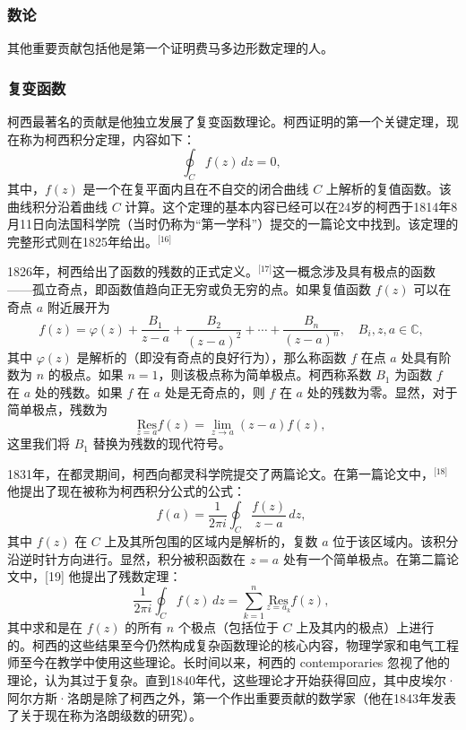 \subsubsection{数论}  
其他重要贡献包括他是第一个证明费马多边形数定理的人。
\subsubsection{复变函数}  
柯西最著名的贡献是他独立发展了复变函数理论。柯西证明的第一个关键定理，现在称为柯西积分定理，内容如下：
\[
\oint_{C} f(z) \, dz = 0,~
\]
其中，\( f(z) \) 是一个在复平面内且在不自交的闭合曲线 \( C \) 上解析的复值函数。该曲线积分沿着曲线 \( C \) 计算。这个定理的基本内容已经可以在24岁的柯西于1814年8月11日向法国科学院（当时仍称为“第一学科”）提交的一篇论文中找到。该定理的完整形式则在1825年给出。\(^\text{[16]}\)

1826年，柯西给出了函数的残数的正式定义。\(^\text{[17]}\)这一概念涉及具有极点的函数——孤立奇点，即函数值趋向正无穷或负无穷的点。如果复值函数 \( f(z) \) 可以在奇点 \( a \) 附近展开为
\[
f(z) = \varphi(z) + \frac{B_1}{z-a} + \frac{B_2}{(z-a)^2} + \cdots + \frac{B_n}{(z-a)^n}, \quad B_i, z, a \in \mathbb{C},~
\]
其中 \( \varphi(z) \) 是解析的（即没有奇点的良好行为），那么称函数 \( f \) 在点 \( a \) 处具有阶数为 \( n \) 的极点。如果 \( n = 1 \)，则该极点称为简单极点。柯西称系数 \( B_1 \) 为函数 \( f \) 在 \( a \) 处的残数。如果 \( f \) 在 \( a \) 处是无奇点的，则 \( f \) 在 \( a \) 处的残数为零。显然，对于简单极点，残数为
\[
\underset{z=a}{\mathrm{Res}} f(z) = \lim_{z \to a} (z-a) f(z),~
\]
这里我们将 \( B_1 \) 替换为残数的现代符号。

1831年，在都灵期间，柯西向都灵科学院提交了两篇论文。在第一篇论文中，\(^\text{[18]}\)他提出了现在被称为柯西积分公式的公式：
\[
f(a) = \frac{1}{2\pi i} \oint_C \frac{f(z)}{z-a} \, dz,~
\]
其中 \( f(z) \) 在 \( C \) 上及其所包围的区域内是解析的，复数 \( a \) 位于该区域内。该积分沿逆时针方向进行。显然，积分被积函数在 \( z = a \) 处有一个简单极点。在第二篇论文中，[19] 他提出了残数定理：
\[
\frac{1}{2\pi i} \oint_C f(z) \, dz = \sum_{k=1}^{n} \underset{z = a_k}{\mathrm{Res}} f(z),~
\]
其中求和是在 \( f(z) \) 的所有 \( n \) 个极点（包括位于 \( C \) 上及其内的极点）上进行的。柯西的这些结果至今仍然构成复杂函数理论的核心内容，物理学家和电气工程师至今在教学中使用这些理论。长时间以来，柯西的 contemporaries 忽视了他的理论，认为其过于复杂。直到1840年代，这些理论才开始获得回应，其中皮埃尔·阿尔方斯·洛朗是除了柯西之外，第一个作出重要贡献的数学家（他在1843年发表了关于现在称为洛朗级数的研究）。
